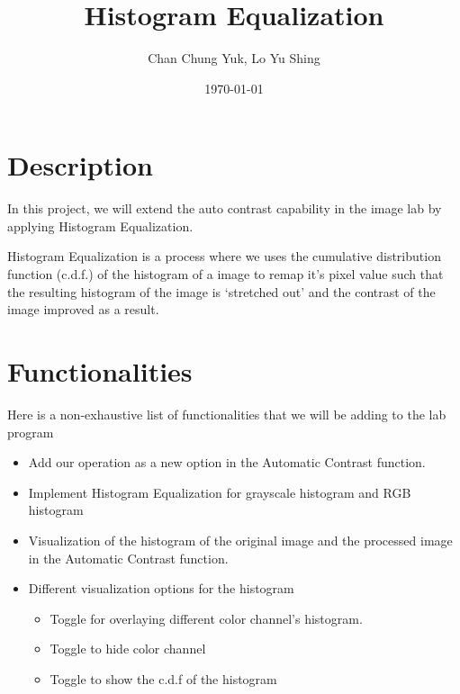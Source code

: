 \documentclass[a4paper]{article}
\title{Histogram Equalization}
\author{Chan Chung Yuk, Lo Yu Shing}
\date{\today}
\begin{document}
\maketitle

\section{Description}
In this project, we will extend the auto contrast capability in the image lab by applying Histogram Equalization. 

Histogram Equalization is a process where we uses the cumulative distribution function (c.d.f.) of the histogram of a image to remap it's pixel value such that the resulting histogram of the image is `stretched out' and the contrast of the image improved as a result.

\section{Functionalities}
Here is a non-exhaustive list of functionalities that we will be adding to the lab program
\begin{itemize}
    \item Add our operation as a new option in the Automatic Contrast function.
    \item Implement Histogram Equalization for grayscale histogram and RGB histogram
    \item Visualization of the histogram of the original image and the processed image in the Automatic Contrast function.
    \item Different visualization options for the histogram 
    \begin{itemize}
	\item Toggle for overlaying different color channel's histogram.
	\item Toggle to hide color channel
	\item Toggle to show the c.d.f of the histogram 
    \end{itemize}
\end{itemize}
\end{document}
